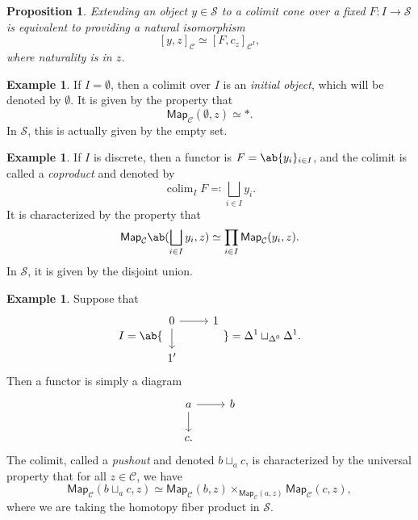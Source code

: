 \documentclass[10pt, oneside]{memoir}
\newtheorem{prop}[thm]{Proposition}
\theoremstyle{definition}
\newtheorem{exm}[thm]{Example}
\theoremstyle{remark}
\theoremstyle{plain}
\theoremstyle{definition}
\theoremstyle{remark}
\newcommand{\mc}[1]{\mathcal{#1}}
\newcommand{\ms}[1]{\mathsf{#1}}
\newcommand{\1}{\mathbf{1}}
\newcommand{\2}{\mathbf{2}}
\newcommand{\3}{\mathbf{3}}
\DeclareMathOperator*{\colim}{colim}
\begin{document}
\begin{prop}
    Extending an object \(y \in \mc{S} \) to a colimit cone over a fixed \(F \colon I \to \mc{S} \) is equivalent to providing a natural isomorphism
    \[ [y, z]_{\mc{C}} \simeq [F, c_z]_{\mc{C}^I}, \]
    where naturality is in \(z \).
\end{prop}

\begin{exm}
    If \(I = \emptyset \), then a colimit over \(I \) is an \textit{initial object}, which will be denoted by \(\emptyset \). It is given by the property that
    \[ \ms{Map}_{\mc{C}}(\emptyset, z) \simeq *. \]
    In \(\mc{S} \), this is actually given by the empty set.
\end{exm}

\begin{exm}
    If \(I \) is discrete, then a functor is \(F = \ab\{y_i \}_{i \in I} \), and the colimit is called a \textit{coproduct} and denoted by
    \[ \colim_I F \eqqcolon \bigsqcup_{i \in I} y_i. \]
    It is characterized by the property that
    \[ \ms{Map}_{\mc{C}}\ab(\bigsqcup_{i\in I} y_i, z) \simeq \prod_{i \in I} \ms{Map}_{\mc{C}}(y_i, z). \]
    In \(\mc{S} \), it is given by the disjoint union.
\end{exm}

\begin{exm}
    Suppose that
    \begin{equation*}I = \ab\{
    \begin{tikzcd}[ampersand replacement=\&]
        0 \ar{r} \ar{d} \& 1 \\
        1' 
    \end{tikzcd} \} = \Delta^1 \sqcup_{\Delta^0} \Delta^1.
    \end{equation*}
    Then a functor is simply a diagram
    \begin{equation*}
    \begin{tikzcd}
        a \ar{r} \ar{d} & b \\
        c.
    \end{tikzcd}
    \end{equation*}
    The colimit, called a \textit{pushout} and denoted \(b \sqcup_a c \), is characterized by the universal property that for all \(z \in \mc{C} \), we have
    \[ \ms{Map}_{\mc{C}}(b \sqcup_a c, z) \simeq \ms{Map}_{\mc{C}}(b, z) \times_{\ms{Map}_{\mc{C}}(a, z)} \ms{Map}_{\mc{C}}(c, z), \]
    where we are taking the homotopy fiber product in \(\mc{S} \).
\end{exm}
\end{document}
